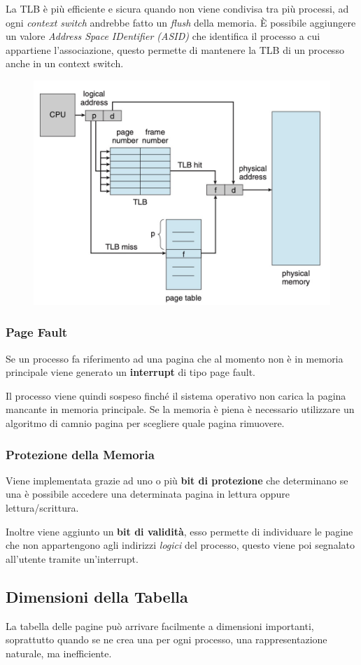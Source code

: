La TLB è più efficiente e sicura quando non viene condivisa tra più processi, ad ogni \textit{context switch} andrebbe fatto un \textit{flush} della memoria.
È possibile aggiungere un valore \textit{Address Space IDentifier (ASID)} che identifica il processo a cui appartiene l'associazione, questo permette di mantenere la TLB di un processo anche in un context switch.

\begin{figure}[H]
    \centering
    \includegraphics[width=0.5\linewidth]{assets/paginazione-tlb.jpg}
\end{figure}

\subsubsection{Page Fault}
Se un processo fa riferimento ad una pagina che al momento non è in memoria principale viene generato un \textbf{interrupt} di tipo page fault.

Il processo viene quindi sospeso finché il sistema operativo non carica la pagina mancante in memoria principale. Se la memoria è piena è necessario utilizzare un algoritmo di camnio pagina per scegliere quale pagina rimuovere.

\subsubsection{Protezione della Memoria}
Viene implementata grazie ad uno o più \textbf{bit di protezione} che determinano se una è possibile accedere una determinata pagina in lettura oppure lettura/scrittura.

\spacer
Inoltre viene aggiunto un \textbf{bit di validità}, esso permette di individuare le pagine che non appartengono agli indirizzi \textit{logici} del processo, questo viene poi segnalato all'utente tramite un'interrupt.

\subsection{Dimensioni della Tabella}
La tabella delle pagine può arrivare facilmente a dimensioni importanti, soprattutto quando se ne crea una per ogni processo, una rappresentazione naturale, ma inefficiente.

